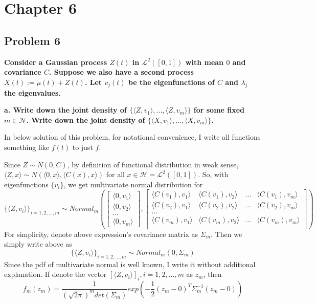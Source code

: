\documentclass{article}
\begin{document}
\section{Chapter 6}
\subsection{Problem 6}
\textbf{
Consider a Gaussian process $Z(t)$ in $\mathcal{L}^2([0,1])$ with mean $0$ and covariance $C$.
Suppose we also have a second process $X(t):=\mu(t)+Z(t)$.
Let $v_j(t)$ be the eigenfunctions of $C$ and $\lambda_j$ the eigenvalues.
}

\textbf{
a. Write down the joint density of $\{\langle Z, v_1\rangle,...,\langle Z, v_m\rangle\}$ for some fixed $m\in\mathcal{N}$.
Write down the joint density of $\{\langle X, v_1\rangle,...,\langle X, v_m\rangle\}$.
}

In below solution of this problem, for notational convenience, I write all functions something like $f(t)$ to just $f$.

Since $Z \sim N(0, C)$, by definition of functional distribution in weak sense,
\(\langle Z, x\rangle \sim N(\langle 0,x \rangle, \langle C(x),x\rangle)\) for all $x\in \mathcal{H}=\mathcal{L}^2([0,1])$.
So, with eigenfunctions $\{v_i\}$, we get multivariate normal distribution for
\[\{\langle Z, v_i\rangle\}_{i=1,2,...,m} \sim Normal_m(
\begin{bmatrix}
    \langle 0,v_1 \rangle \\
    \langle 0,v_2 \rangle \\
    ... \\
    \langle 0,v_m \rangle
\end{bmatrix}
,
\begin{bmatrix}
    \langle C(v_1),v_1 \rangle & \langle C(v_1),v_2 \rangle & ... & \langle C(v_1),v_m \rangle \\
    \langle C(v_2),v_1 \rangle & \langle C(v_2),v_2 \rangle & ... & \langle C(v_2),v_m \rangle \\
    ... \\
    \langle C(v_m),v_1 \rangle & \langle C(v_m),v_2 \rangle & ... & \langle C(v_m),v_m \rangle \\
\end{bmatrix}
)\]
For simplicity, denote above expression's covariance matrix as $\Sigma_m$. Then we simply write above as
\[\{\langle Z, v_i\rangle\}_{i=1,2,...,m} \sim Normal_m(0,\Sigma_m)\]
Since the pdf of multivariate normal is well known, I write it without additional explanation.
If denote the vector \([\langle Z, v_i\rangle]_i, i=1,2,...,m\) as $z_m$, then
\[
    f_m(z_m) = \frac{1}{(\sqrt{2\pi})^m det(\Sigma_m)}exp{(-\frac{1}{2}(z_m-0)^T\Sigma_m^{-1}(z_m-0))}
\]
\end{document}
